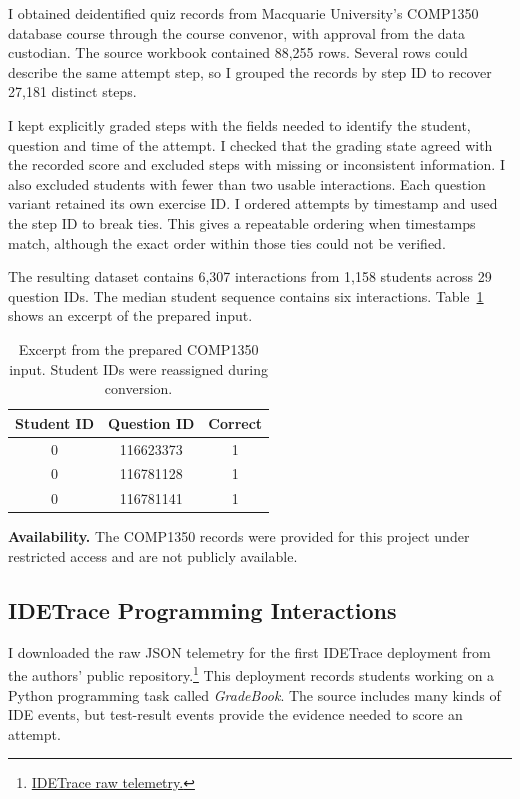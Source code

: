 \documentclass[11pt]{article}
\begin{document}
I obtained deidentified quiz records from Macquarie University's
COMP1350 database course through the course convenor, with approval
from the data custodian. The source workbook contained 88,255 rows.
Several rows could describe the same attempt step, so I grouped the
records by step ID to recover 27,181 distinct steps.

I kept explicitly graded steps with the fields needed to identify the
student, question and time of the attempt. I checked that the grading
state agreed with the recorded score and excluded steps with missing
or inconsistent information. I also excluded students with fewer
than two usable interactions. Each question variant retained its own
exercise ID. I ordered attempts by timestamp and used the step ID to
break ties. This gives a repeatable ordering when timestamps match,
although the exact order within those ties could not be verified.

The resulting dataset contains 6,307 interactions from 1,158 students
across 29 question IDs. The median student sequence contains six
interactions. Table~\ref{tab:comp1350-input} shows an excerpt of the
prepared input.

\begin{table}[H]
\centering
\small
\begin{tabular}{@{}ccc@{}}
\hline
Student ID & Question ID & Correct \\
\hline
0 & 116623373 & 1 \\
0 & 116781128 & 1 \\
0 & 116781141 & 1 \\
\hline
\end{tabular}
\caption{Excerpt from the prepared COMP1350 input. Student IDs were
reassigned during conversion.}
\label{tab:comp1350-input}
\end{table}

\textbf{Availability.} The COMP1350 records were provided for this
project under restricted access and are not publicly available.

\subsection{IDETrace Programming Interactions}

I downloaded the raw JSON telemetry for the first IDETrace deployment
from the authors' public repository.\footnote{\href{https://github.com/divadbaroon/TutorTrace_dataset_and_benchmark/tree/main/dataset/raw_telemetry}{IDETrace raw telemetry.}}
This deployment records students working on a Python programming task
called \textit{GradeBook}. The source includes many kinds of IDE events,
but test-result events provide the evidence needed to score an attempt.
\end{document}
